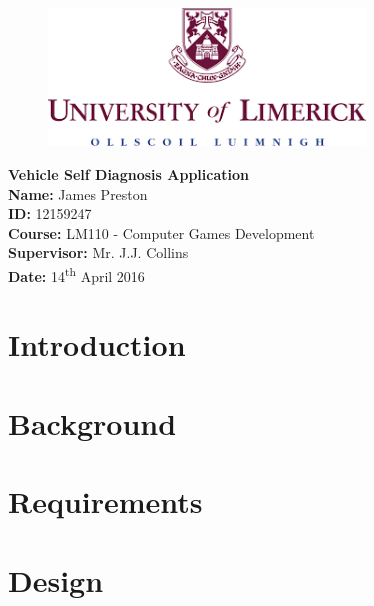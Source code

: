 \documentclass[12pt]{report}
\begin{document}
\begin{titlepage}
	\begin{center}		
		\vspace*{1cm}
		\begin{figure}[h]
			\includegraphics[width=0.75\textwidth , center]{UL.png}
		\end{figure}
		\vspace*{5cm}
		\textbf{\LARGE{Vehicle Self Diagnosis Application}}\\
		\vspace{5cm}
		\large{		
		\textbf{Name:} James Preston\\
		\textbf{ID:} 12159247\\
		\textbf{Course:} LM110 - Computer Games Development\\
		\textbf{Supervisor:} Mr. J.J. Collins\\
		\textbf{Date:} 14\textsuperscript{th} April 2016 \\
		}
	\end{center}
\end{titlepage}

	\tableofcontents
	\newpage

	\chapter{Introduction}
		
	\newpage 
	
	\chapter{Background}
		
	\newpage

	\chapter{Requirements}
		
	\newpage	

	\chapter{Design}
		
	\newpage
	
\end{document}
